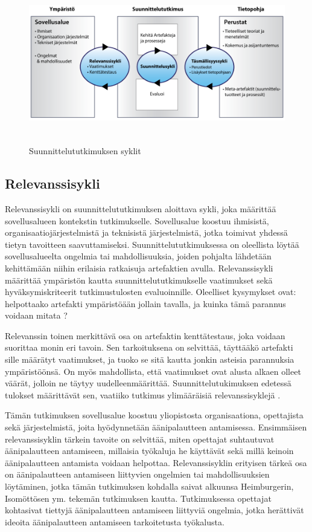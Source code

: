 \documentclass[utf8]{gradu3}
\begin{document}
\begin{figure}[h]\centering
  \includegraphics[height=7cm,keepaspectratio]{DSR}
  \caption[]{Suunnittelututkimuksen syklit}
  \label{fig:dsr}
\end{figure}

\subsection{Relevanssisykli}

Relevanssisykli on suunnittelututkimuksen aloittava sykli, joka määrittää sovellusalueen kontekstin tutkimukselle. Sovellusalue koostuu ihmisistä, organisaatiojärjestelmistä ja teknisistä järjestelmistä, jotka toimivat yhdessä tietyn tavoitteen saavuttamiseksi. Suunnittelututkimuksessa on oleellista löytää sovellusalueelta ongelmia tai mahdollisuuksia, joiden pohjalta lähdetään kehittämään niihin erilaisia ratkaisuja artefaktien avulla. Relevanssisykli määrittää ympäristön kautta suunnittelututkimukselle vaatimukset sekä hyväksymiskriteerit tutkimustulosten evaluoinnille. Oleelliset kysymykset ovat: helpottaako artefakti ympäristöään jollain tavalla, ja kuinka tämä parannus voidaan mitata \parencite[][]{cycles}?

Relevanssin toinen merkittävä osa on artefaktin kenttätestaus, joka voidaan suorittaa monin eri tavoin. Sen tarkoituksena on selvittää, täyttääkö artefakti sille määrätyt vaatimukset, ja tuoko se sitä kautta jonkin asteisia parannuksia ympäristöönsä. On myös mahdollista, että vaatimukset ovat alusta alkaen olleet väärät, jolloin ne täytyy uudelleenmäärittää. Suunnittelutukimuksen edetessä tulokset määrittävät sen, vaatiiko tutkimus ylimääräisiä relevanssisyklejä \parencite[][]{cycles}.

Tämän tutkimuksen sovellusalue koostuu yliopistosta organisaationa, opettajista sekä järjestelmistä, joita hyödynnetään äänipalautteen antamisessa. Ensimmäisen relevanssisyklin tärkein tavoite on selvittää, miten opettajat suhtautuvat äänipalautteen antamiseen, millaisia työkaluja he käyttävät sekä millä keinoin äänipalautteen antamista voidaan helpottaa. Relevanssisyklin erityisen tärkeä osa on äänipalautteen antamiseen liittyvien ongelmien tai mahdollisuuksien löytäminen, jotka tämän tutkimuksen kohdalla saivat alkuunsa Heimburgerin, Isomöttösen ym. \parencite[][]{academics} tekemän tutkimuksen kautta. Tutkimuksessa opettajat kohtasivat tiettyjä äänipalautteen antamiseen liittyviä ongelmia, jotka herättivät ideoita äänipalautteen antamiseen tarkoitetusta työkalusta.
\end{document}
